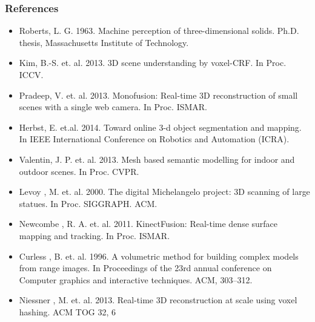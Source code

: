 \documentclass[mathserif]{beamer}
\begin{document}
\begin{frame}
\frametitle{References}
\fontsize{6pt}{7.2}\selectfont
\begin{itemize}
  \item Roberts, L. G. 1963. Machine perception of three-dimensional solids. Ph.D. thesis, Massachusetts Institute of Technology.

  \item Kim, B.-S. et. al. 2013. 3D scene understanding by voxel-CRF. In Proc. ICCV.

  \item Pradeep, V. et. al. 2013. Monofusion: Real-time 3D reconstruction of small scenes with a single web camera. In Proc. ISMAR.

  \item Herbst, E. et.al. 2014. Toward online 3-d object segmentation and mapping. In IEEE International Conference on Robotics and Automation (ICRA).

  \item Valentin, J. P. et. al. 2013. Mesh based semantic modelling for indoor and outdoor scenes. In Proc. CVPR.

  \item Levoy , M. et. al. 2000. The digital Michelangelo project: 3D scanning of large statues. In Proc. SIGGRAPH. ACM.

  \item Newcombe , R. A. et. al. 2011. KinectFusion: Real-time dense surface mapping and tracking. In Proc. ISMAR.  
  
  \item Curless , B. et. al. 1996. A volumetric method for building complex models from range images. In Proceedings of the 23rd annual conference on Computer graphics and interactive techniques. ACM, 303–312.
  
  \item Niessner , M. et. al. 2013. Real-time 3D reconstruction at scale using voxel hashing. ACM TOG 32, 6
\end{itemize}
\end{frame}
\end{document}
